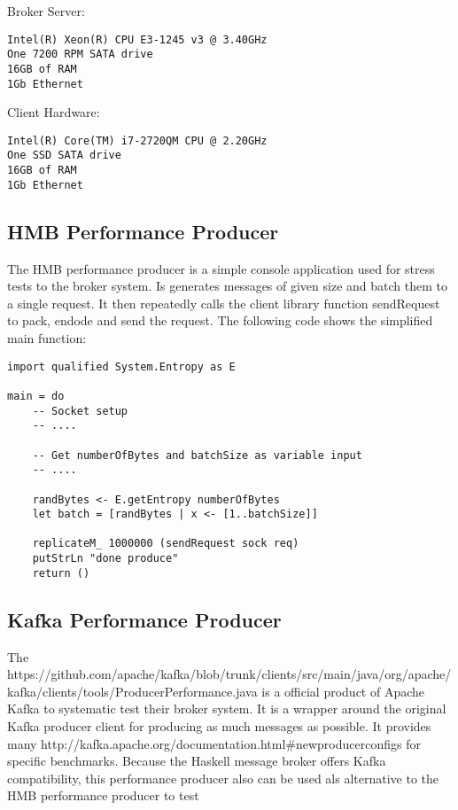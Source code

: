 Broker Server:
\begin{verbatim}
Intel(R) Xeon(R) CPU E3-1245 v3 @ 3.40GHz
One 7200 RPM SATA drive
16GB of RAM
1Gb Ethernet 
\end{verbatim}

Client Hardware:
\begin{verbatim}
Intel(R) Core(TM) i7-2720QM CPU @ 2.20GHz
One SSD SATA drive
16GB of RAM 
1Gb Ethernet
\end{verbatim}

\subsection{HMB Performance Producer}
\label{conc-eval-hmbperformanceprod}
The HMB performance producer is a simple console application used for stress
tests to the broker system. Is generates messages of given size and batch them
to a single request. It then repeatedly calls the client library function
sendRequest to pack, endode and send the request. The following code shows the
simplified main function: 

\begin{lstlisting}
import qualified System.Entropy as E

main = do 
    -- Socket setup 
    -- ....

    -- Get numberOfBytes and batchSize as variable input 
    -- ....

    randBytes <- E.getEntropy numberOfBytes 
    let batch = [randBytes | x <- [1..batchSize]]

    replicateM_ 1000000 (sendRequest sock req) 
    putStrLn "done produce"
    return ()

\end{lstlisting}

\subsection{Kafka Performance Producer}
\label{conc-eval-kafkaperformanceprod}
The 
{https://github.com/apache/kafka/blob/trunk/clients/src/main/java/org/apache/kafka/clients/tools/ProducerPerformance.java}
is a official product of Apache Kafka to systematic test their broker
system. It is a wrapper around the original Kafka producer client for producing
as much messages as possible. It provides many 
{http://kafka.apache.org/documentation.html\#newproducerconfigs} for specific
benchmarks. Because the Haskell message broker offers Kafka compatibility,  this
performance producer also can be used als alternative to the HMB performance
producer to test 

